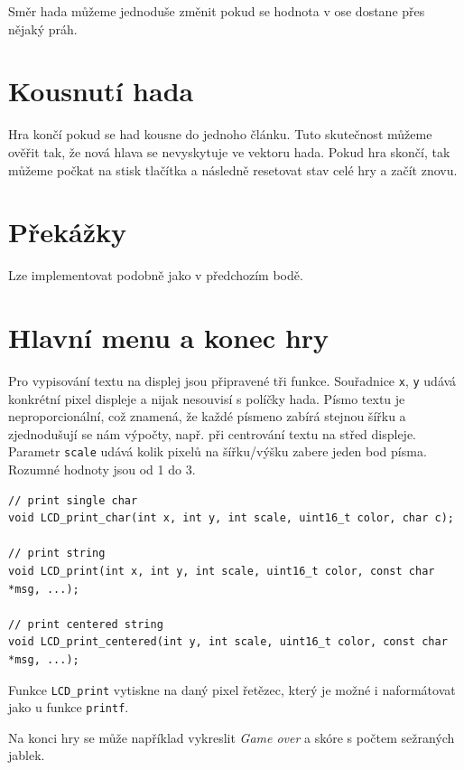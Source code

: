 \documentclass[12pt]{article}
\begin{document}
Směr hada můžeme jednoduše změnit pokud se hodnota v ose dostane přes nějaký práh.

\section{Kousnutí hada}
Hra končí pokud se had kousne do jednoho článku.
Tuto skutečnost můžeme ověřit tak, že nová hlava se nevyskytuje ve vektoru hada.
Pokud hra skončí, tak můžeme počkat na stisk tlačítka a následně resetovat stav celé hry a začít znovu.

\section{Překážky}
Lze implementovat podobně jako v předchozím bodě.

\section{Hlavní menu a konec hry}
Pro vypisování textu na displej jsou připravené tři funkce.
Souřadnice \texttt{x}, \texttt{y} udává konkrétní pixel displeje a nijak nesouvisí s políčky hada.
Písmo textu je neproporcionální, což znamená, že každé písmeno zabírá stejnou šířku a zjednodušují se nám výpočty, např. při centrování textu na střed displeje.
Parametr \texttt{scale} udává kolik pixelů na šířku/výšku zabere jeden bod písma.
Rozumné hodnoty jsou od 1 do 3.


\begin{verbatim}
// print single char
void LCD_print_char(int x, int y, int scale, uint16_t color, char c);

// print string
void LCD_print(int x, int y, int scale, uint16_t color, const char *msg, ...);

// print centered string
void LCD_print_centered(int y, int scale, uint16_t color, const char *msg, ...);
\end{verbatim}

Funkce \texttt{LCD\_print} vytiskne na daný pixel řetězec, který je možné i naformátovat jako u funkce \texttt{printf}.

Na konci hry se může například vykreslit \textit{Game over} a skóre s počtem sežraných jablek.
\end{document}
